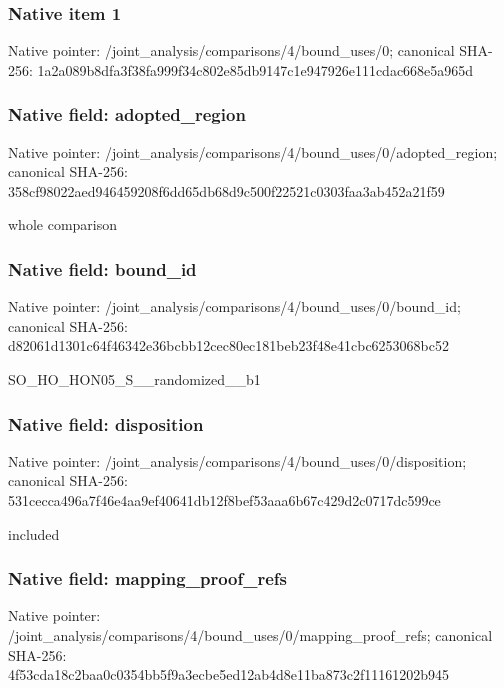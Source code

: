 \documentclass[10pt,a4paper]{article}
\begin{document}
\subsubsection{Native item 1}
Native pointer: /joint\_\allowbreak{}analysis/comparisons/4/bound\_\allowbreak{}uses/0; canonical SHA-256: 1a2a089b8dfa3f38fa999f34c802e85db9147c1e947926e111cdac668e5a965d

\subsubsection{Native field: adopted\_\allowbreak{}region}
Native pointer: /joint\_\allowbreak{}analysis/comparisons/4/bound\_\allowbreak{}uses/0/adopted\_\allowbreak{}region; canonical SHA-256: 358cf98022aed946459208f6dd65db68d9c500f22521c0303faa3ab452a21f59

\begingroup\raggedright\sloppy whole comparison\par\endgroup

\subsubsection{Native field: bound\_\allowbreak{}id}
Native pointer: /joint\_\allowbreak{}analysis/comparisons/4/bound\_\allowbreak{}uses/0/bound\_\allowbreak{}id; canonical SHA-256: d82061d1301c64f46342e36bcbb12cec80ec181beb23f48e41cbc6253068bc52

\begingroup\raggedright\sloppy SO\_\allowbreak{}HO\_\allowbreak{}HON05\_\allowbreak{}S\_\allowbreak{}\_\allowbreak{}randomized\_\allowbreak{}\_\allowbreak{}b1\par\endgroup

\subsubsection{Native field: disposition}
Native pointer: /joint\_\allowbreak{}analysis/comparisons/4/bound\_\allowbreak{}uses/0/disposition; canonical SHA-256: 531cecca496a7f46e4aa9ef40641db12f8bef53aaa6b67c429d2c0717dc599ce

\begingroup\raggedright\sloppy included\par\endgroup

\subsubsection{Native field: mapping\_\allowbreak{}proof\_\allowbreak{}refs}
Native pointer: /joint\_\allowbreak{}analysis/comparisons/4/bound\_\allowbreak{}uses/0/mapping\_\allowbreak{}proof\_\allowbreak{}refs; canonical SHA-256: 4f53cda18c2baa0c0354bb5f9a3ecbe5ed12ab4d8e11ba873c2f11161202b945
\end{document}
